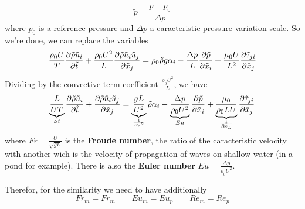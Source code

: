 		\begin{equation}
			\tilde{p} = \frac{p-p_0}{\Delta p}
		\end{equation}
		where $p_0$ is a reference pressure and $\Delta p$ a caracteristic pressure variation scale. So we're done, we can replace the variables 
		\begin{equation}
			\frac{\rho _0 U}{T} \frac{\partial \tilde{\rho}\tilde{ u}_i}{\partial \tilde{t}} + \frac{\rho _0 U^2}{L} \frac{\partial \tilde{\rho} \tilde{u}_i \tilde{u}_j}{\partial \tilde{x}_j} = \rho _0 \tilde{\rho} g \alpha _i - \frac{\Delta p}{L} \frac{\partial \tilde{p}}{\partial \tilde{x}_i} + \frac{\mu _ 0 U}{L^2}\frac{\partial \tilde{\tau} _{ji}}{\partial \tilde{x}_j}
		\end{equation}
		Dividing by the convective term coefficient $\frac{\rho _0 U^2}{L}$, we have 
		\begin{equation}
			\underbrace{\frac{L}{UT}}_{St} \frac{\partial \tilde{\rho}\tilde{ u}_i}{\partial \tilde{t}} + \frac{\partial \tilde{\rho} \tilde{u}_i \tilde{u}_j}{\partial \tilde{x}_j} =  \underbrace{\frac{gL}{U^2}}_{\frac{1}{Fr^2}} \tilde{\rho} \alpha _i - \underbrace{\frac{\Delta p}{\rho_0 U^2 }}_{Eu} \frac{\partial \tilde{p}}{\partial \tilde{x}_i} + \underbrace{\frac{\mu _ 0}{\rho _0 LU}}_{\frac{1}{Re_L}}\frac{\partial \tilde{\tau} _{ji}}{\partial \tilde{x}_j}
		\end{equation}
		where $Fr = \frac{U}{\sqrt{gL}}$ is the \textbf{Froude number}, the ratio of the caracteristic velocity with another wich is the velocity of propagation of waves on shallow water (in a pond for example). There is also the \textbf{Euler number} $Eu = \frac{\Delta p}{\rho _0 U^2}$.
		\begin{center}
		\end{center}
		Therefor, for the similarity we need to have additionally
		\begin{equation}
			Fr_m = Fr_m \qquad Eu _m = Eu _p \qquad Re_m = Re_p
		\end{equation}
		
